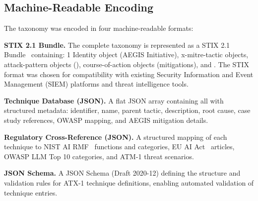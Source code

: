\documentclass{IEEEoj-data}
\begin{document}
\subsection*{Machine-Readable Encoding}

The taxonomy was encoded in four machine-readable formats:

{\bf STIX 2.1 Bundle.} The complete taxonomy is represented as a STIX 2.1 Bundle~\cite{ref7} containing: 1 Identity object (AEGIS Initiative),  x-mitre-tactic objects,  attack-pattern objects (),  course-of-action objects (mitigations), and . The STIX format was chosen for compatibility with existing Security Information and Event Management (SIEM) platforms and threat intelligence tools.

{\bf Technique Database (JSON).} A flat JSON array containing all  with structured metadata: identifier, name, parent tactic, description, root cause, case study references, OWASP mapping, and AEGIS mitigation details.

{\bf Regulatory Cross-Reference (JSON).} A structured mapping of each technique to NIST AI RMF~\cite{ref8} functions and categories, EU AI Act~\cite{ref9} articles, OWASP LLM Top 10 categories, and ATM-1 threat scenarios.

{\bf JSON Schema.} A JSON Schema (Draft 2020-12) defining the structure and validation rules for ATX-1 technique definitions, enabling automated validation of technique entries.
\end{document}
